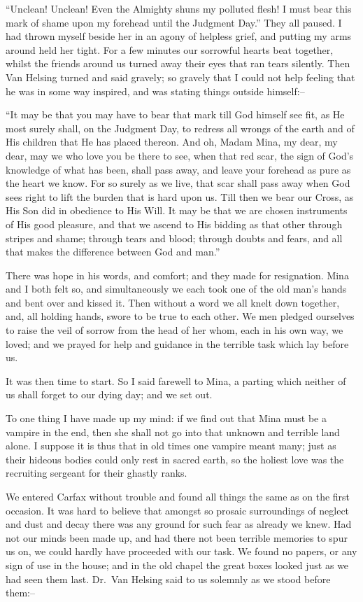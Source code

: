\documentclass[12pt,openright]{book}
\begin{document}
“Unclean! Unclean! Even the Almighty shuns my polluted flesh! I must bear this mark of shame upon my forehead until the Judgment Day.” They all paused. I had thrown myself beside her in an agony of helpless grief, and putting my arms around held her tight. For a few minutes our sorrowful hearts beat together, whilst the friends around us turned away their eyes that ran tears silently. Then Van Helsing turned and said gravely; so gravely that I could not help feeling that he was in some way inspired, and was stating things outside himself:–

“It may be that you may have to bear that mark till God himself see fit, as He most surely shall, on the Judgment Day, to redress all wrongs of the earth and of His children that He has placed thereon. And oh, Madam Mina, my dear, my dear, may we who love you be there to see, when that red scar, the sign of God’s knowledge of what has been, shall pass away, and leave your forehead as pure as the heart we know. For so surely as we live, that scar shall pass away when God sees right to lift the burden that is hard upon us. Till then we bear our Cross, as His Son did in obedience to His Will. It may be that we are chosen instruments of His good pleasure, and that we ascend to His bidding as that other through stripes and shame; through tears and blood; through doubts and fears, and all that makes the difference between God and man.”

There was hope in his words, and comfort; and they made for resignation. Mina and I both felt so, and simultaneously we each took one of the old man’s hands and bent over and kissed it. Then without a word we all knelt down together, and, all holding hands, swore to be true to each other. We men pledged ourselves to raise the veil of sorrow from the head of her whom, each in his own way, we loved; and we prayed for help and guidance in the terrible task which lay before us.

It was then time to start. So I said farewell to Mina, a parting which neither of us shall forget to our dying day; and we set out.

To one thing I have made up my mind: if we find out that Mina must be a vampire in the end, then she shall not go into that unknown and terrible land alone. I suppose it is thus that in old times one vampire meant many; just as their hideous bodies could only rest in sacred earth, so the holiest love was the recruiting sergeant for their ghastly ranks.

We entered Carfax without trouble and found all things the same as on the first occasion. It was hard to believe that amongst so prosaic surroundings of neglect and dust and decay there was any ground for such fear as already we knew. Had not our minds been made up, and had there not been terrible memories to spur us on, we could hardly have proceeded with our task. We found no papers, or any sign of use in the house; and in the old chapel the great boxes looked just as we had seen them last. Dr. Van Helsing said to us solemnly as we stood before them:–
\end{document}
